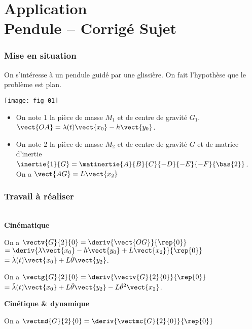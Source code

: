 \chapter*{Application  \\ 
Pendule -- \ifprof Corrigé \else Sujet \fi}

\iflivret {} \else
\ifprof  {} \else \fi
\fi

\setcounter{question}{0}
\marginnote{}



\subsection*{Mise en situation}
On s'intéresse à un pendule guidé par une glissière. On fait l'hypothèse que le problème est plan. 

\begin{marginfigure}
\texttt{[image: fig\_01]}
\end{marginfigure}

\begin{itemize}
\item On note 1 la pièce de masse $M_1$ et de centre de gravité $G_1$. $\vect{OA}=\lambda(t)\vect{x_0}-h\vect{y_0}$.
\item On note 2 la pièce de masse $M_2$ et de centre de gravité $G$ et de matrice d'inertie $\inertie{1}{G}= \matinertie{A}{B}{C}{-D}{-E}{-F}{\bas{2}}$. On a $\vect{AG}=L\vect{x_2}$
\end{itemize}

\subsection*{Travail à réaliser}

\ifprof
\begin{corrige}
~\\

\textbf{Cinématique}

On a $\vectv{G}{2}{0}=\deriv{\vect{OG}}{\rep{0}} $ 
$=\deriv{\lambda\vect{x_0}-h\vect{y_0}+L\vect{x_2}}{\rep{0}}$ 
$=\dot{\lambda}(t)\vect{x_0}+L\dot{\theta}\vect{y_2}$.



On a $\vectg{G}{2}{0}=\deriv{\vectv{G}{2}{0}}{\rep{0}} $ 
$=\ddot{\lambda}(t)\vect{x_0}+L\ddot{\theta}\vect{y_2}-L\dot{\theta}^2\vect{x_2}$.

\textbf{Cinétique \& dynamique}


On a $\vectmd{G}{2}{0} = \deriv{\vectmc{G}{2}{0}}{\rep{0}} $
\end{corrige}
\else
\fi



\ifprof
\begin{corrige}
\end{corrige}
\else
\fi

